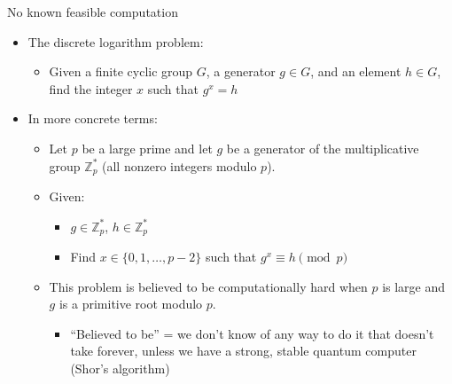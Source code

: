 \documentclass[aspectratio=169, lualatex, handout]{beamer}
\begin{document}
\begin{frame}{No known feasible computation}
	\begin{itemize}[<+->]
		\item The discrete logarithm problem:
		      \begin{itemize}
			      \item Given a finite cyclic group $G$, a generator $g \in G$, and an element
			            $h \in G$, find the integer $x$ such that $g^{x}=h$
		      \end{itemize}
		\item In more concrete terms:
		      \begin{itemize}
			      \item Let $p$ be a large prime and let $g$ be a generator of the multiplicative
			            group $\mathbb{Z}_{p}^{*}$ (all nonzero integers modulo $p$).

			      \item Given:
			            \begin{itemize}
				            \item $g \in \mathbb{Z}_{p}^{*}$, $h \in \mathbb{Z}_{p}^{*}$

				            \item Find $x \in \{0, 1, \ldots, p-2\}$ such that $g^{x} \equiv h \pmod
					                  {p}$
			            \end{itemize}

			      \item This problem is believed to be computationally hard when $p$ is large
			            and $g$ is a primitive root modulo $p$.
			            \begin{itemize}
				            \item ``Believed to be'' = we don't know of any way to do it that doesn't
				                  take forever, unless we have a strong, stable quantum computer (Shor's
				                  algorithm)
			            \end{itemize}
		      \end{itemize}
	\end{itemize}
\end{frame}
\end{document}
